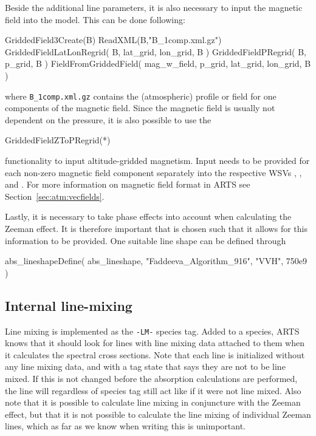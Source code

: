 Beside the additional line parameters, it is also necessary to input the magnetic
field into the model. This can be done following:
\begin{code}
GriddedField3Create(B)
  ReadXML(B,"B_1comp.xml.gz")
  GriddedFieldLatLonRegrid( B, lat_grid, lon_grid, B )
  GriddedFieldPRegrid( B, p_grid, B )
  FieldFromGriddedField( mag_w_field, p_grid, lat_grid, 
                         lon_grid, B )
\end{code}
where \verb|B_1comp.xml.gz| contains the (atmospheric) profile or field for one
components of the magnetic field. 
Since the magnetic field is usually not dependent on the pressure,
it is also possible to use the  
\begin{code}
 GriddedFieldZToPRegrid(*)
\end{code}
functionality to input altitude-gridded magnetism.
Input needs to be provided for each non-zero
magnetic field component separately into the respective WSVs , 
, and . For more information on
magnetic field format in ARTS see Section~\ref{sec:atm:vecfields}.

Lastly, it is necessary to take phase effects into account when calculating the
Zeeman effect. It is therefore important that  is
chosen such that it allows for this information to be provided. One
suitable line shape can be defined through
\begin{code}
abs_lineshapeDefine( abs_lineshape, "Faddeeva_Algorithm_916", 
                     "VVH", 750e9 )
\end{code}

\subsection{Internal line-mixing}
\label{sec:absorption:line-mixing}

Line mixing is implemented as the \verb|-LM-| species tag.  Added to 
a species, ARTS knows that it should look for lines with
line mixing data attached to them when it calculates the spectral cross sections.
Note that each line is initialized without any line mixing data, and with a tag 
state that says they are not to be line mixed.  If this is not changed before the
absorption calculations are performed, the line will regardless of species tag still
act like if it were not line mixed.  Also note that it is possible to calculate line mixing
in conjuncture with the Zeeman effect, but that it is not possible to calculate the line mixing
of individual Zeeman lines, which as far as we know when writing this is unimportant.

